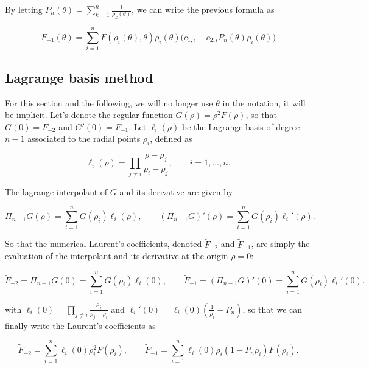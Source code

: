 ﻿\documentclass{article}
\begin{document}
By letting $P_n(\theta) = \sum_{k=1}^{n}\frac{1}{\rho_k(\theta)}$, we can write the previous formula as

\begin{equation}
  \boxed{\widetilde F_{-1}(\theta) = \sum_{i=1}^{n} F(\rho_i(\theta), \theta)\rho_i(\theta)\Big(c_{1, i} - c_{2, i}P_n(\theta)\rho_i(\theta)\Big)}
\end{equation}

\subsection{Lagrange basis method}

For this section and the following, we will no longer use $\theta$ in the notation, it will be implicit. Let's denote the regular function $G(\rho) = \rho^2 F(\rho)$, so that $G(0) = F_{-2}$ and $G'(0) = F_{-1}$. Let $\ell_i(\rho)$ be the Lagrange basis of degree $n-1$ associated to the radial points $\rho_i$, defined as

\begin{equation}
  \ell_i(\rho) = \prod_{j\neq i}\frac{\rho - \rho_j}{\rho_i - \rho_j}, \qquad i = 1, \dots, n.
\end{equation}

The lagrange interpolant of $G$ and its derivative are given by

\begin{equation}
  \Pi_{n-1}G(\rho) = \sum_{i=1}^{n} G(\rho_i)\ell_i(\rho), \qquad (\Pi_{n-1}G)'(\rho) = \sum_{i=1}^{n} G(\rho_i)\ell_i'(\rho).
\end{equation}

So that the numerical Laurent's coefficients, denoted $\widetilde F_{-2}$ and $\widetilde F_{-1}$, are simply the evaluation of the interpolant and its derivative at the origin $\rho = 0$:

\begin{equation}
  \widetilde F_{-2} = \Pi_{n-1}G(0) = \sum_{i=1}^{n} G(\rho_i)\ell_i(0), \qquad \widetilde F_{-1} = (\Pi_{n-1}G)'(0) = \sum_{i=1}^{n} G(\rho_i)\ell_i'(0).
\end{equation}

with $\displaystyle{\ell_i(0) = \prod_{j\neq i}\frac{\rho_j}{\rho_j - \rho_i}}$ and $\displaystyle{\ell_i'(0) = \ell_i(0)\left(\frac{1}{\rho_i} - P_n\right)}$, so that we can finally write the Laurent's coefficients as

\begin{equation}
  \widetilde F_{-2} = \sum_{i=1}^{n} \ell_i(0)\rho_i^2 F(\rho_i), \qquad \widetilde F_{-1} = \sum_{i=1}^{n} \ell_i(0)\rho_i\left(1 - P_n\rho_i\right)F(\rho_i).
\end{equation}
\end{document}
